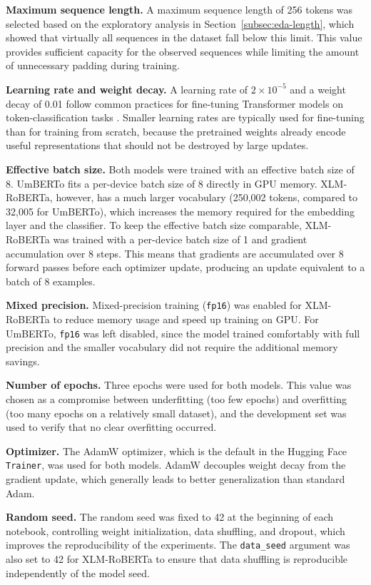 \textbf{Maximum sequence length.} A maximum sequence length of 256 tokens was selected based on the exploratory analysis in Section~\ref{subsec:eda-length}, which showed that virtually all sequences in the dataset fall below this limit. This value provides sufficient capacity for the observed sequences while limiting the amount of unnecessary padding during training.

\textbf{Learning rate and weight decay.} A learning rate of $2 \times 10^{-5}$ and a weight decay of 0.01 follow common practices for fine-tuning Transformer models on token-classification tasks \cite{devlin2019bert}. Smaller learning rates are typically used for fine-tuning than for training from scratch, because the pretrained weights already encode useful representations that should not be destroyed by large updates.

\textbf{Effective batch size.} Both models were trained with an effective batch size of 8. UmBERTo fits a per-device batch size of 8 directly in GPU memory. XLM-RoBERTa, however, has a much larger vocabulary (250,002 tokens, compared to 32,005 for UmBERTo), which increases the memory required for the embedding layer and the classifier. To keep the effective batch size comparable, XLM-RoBERTa was trained with a per-device batch size of 1 and gradient accumulation over 8 steps. This means that gradients are accumulated over 8 forward passes before each optimizer update, producing an update equivalent to a batch of 8 examples.

\textbf{Mixed precision.} Mixed-precision training (\texttt{fp16}) was enabled for XLM-RoBERTa to reduce memory usage and speed up training on GPU. For UmBERTo, \texttt{fp16} was left disabled, since the model trained comfortably with full precision and the smaller vocabulary did not require the additional memory savings.

\textbf{Number of epochs.} Three epochs were used for both models. This value was chosen as a compromise between underfitting (too few epochs) and overfitting (too many epochs on a relatively small dataset), and the development set was used to verify that no clear overfitting occurred.

\textbf{Optimizer.} The AdamW optimizer, which is the default in the Hugging Face \texttt{Trainer}, was used for both models. AdamW decouples weight decay from the gradient update, which generally leads to better generalization than standard Adam.

\textbf{Random seed.} The random seed was fixed to 42 at the beginning of each notebook, controlling weight initialization, data shuffling, and dropout, which improves the reproducibility of the experiments. The \texttt{data\_seed} argument was also set to 42 for XLM-RoBERTa to ensure that data shuffling is reproducible independently of the model seed.

